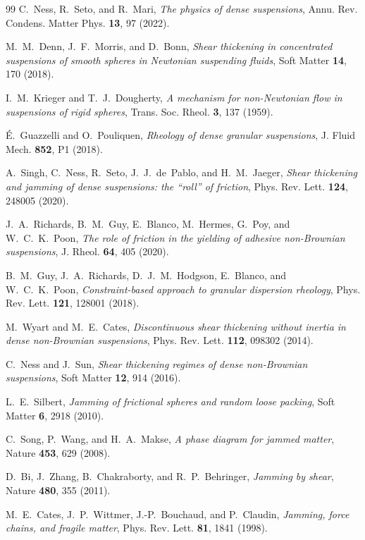 \documentclass[11pt]{article}
\begin{document}
\begin{thebibliography}{99}
 C.~Ness, R.~Seto, and R.~Mari, \emph{The physics of dense suspensions}, Annu. Rev. Condens. Matter Phys. \textbf{13}, 97 (2022).

 M.~M.~Denn, J.~F.~Morris, and D.~Bonn, \emph{Shear thickening in concentrated suspensions of smooth spheres in Newtonian suspending fluids}, Soft Matter \textbf{14}, 170 (2018).

 I.~M.~Krieger and T.~J.~Dougherty, \emph{A mechanism for non-Newtonian flow in suspensions of rigid spheres}, Trans. Soc. Rheol. \textbf{3}, 137 (1959).

 \'E.~Guazzelli and O.~Pouliquen, \emph{Rheology of dense granular suspensions}, J. Fluid Mech. \textbf{852}, P1 (2018).

 A.~Singh, C.~Ness, R.~Seto, J.~J.~de~Pablo, and H.~M.~Jaeger, \emph{Shear thickening and jamming of dense suspensions: the ``roll'' of friction}, Phys. Rev. Lett. \textbf{124}, 248005 (2020).

 J.~A.~Richards, B.~M.~Guy, E.~Blanco, M.~Hermes, G.~Poy, and W.~C.~K.~Poon, \emph{The role of friction in the yielding of adhesive non-Brownian suspensions}, J. Rheol. \textbf{64}, 405 (2020).

 B.~M.~Guy, J.~A.~Richards, D.~J.~M.~Hodgson, E.~Blanco, and W.~C.~K.~Poon, \emph{Constraint-based approach to granular dispersion rheology}, Phys. Rev. Lett. \textbf{121}, 128001 (2018).

 M.~Wyart and M.~E.~Cates, \emph{Discontinuous shear thickening without inertia in dense non-Brownian suspensions}, Phys. Rev. Lett. \textbf{112}, 098302 (2014).

 C.~Ness and J.~Sun, \emph{Shear thickening regimes of dense non-Brownian suspensions}, Soft Matter \textbf{12}, 914 (2016).

 L.~E.~Silbert, \emph{Jamming of frictional spheres and random loose packing}, Soft Matter \textbf{6}, 2918 (2010).

 C.~Song, P.~Wang, and H.~A.~Makse, \emph{A phase diagram for jammed matter}, Nature \textbf{453}, 629 (2008).

 D.~Bi, J.~Zhang, B.~Chakraborty, and R.~P.~Behringer, \emph{Jamming by shear}, Nature \textbf{480}, 355 (2011).

 M.~E.~Cates, J.~P.~Wittmer, J.-P.~Bouchaud, and P.~Claudin, \emph{Jamming, force chains, and fragile matter}, Phys. Rev. Lett. \textbf{81}, 1841 (1998).


\end{thebibliography}
\end{document}
